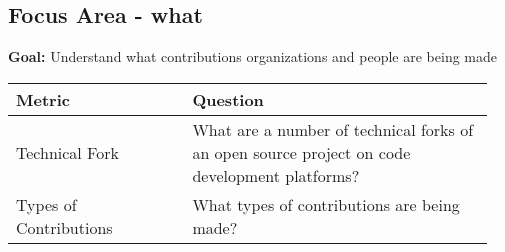 
\subsection{Focus Area - what}
\textbf{Goal:} Understand what contributions organizations and people are being made
\begin{table}[ht!]
    \centering
    \begin{tabular}{|p{0.35\linewidth} | p{0.6\linewidth}|}
        \hline
        \hfil \textbf{Metric}  & \hfil \textbf{Question} \\
        \hline
		Technical Fork & What are a number of technical forks of an open source project on code development platforms? \\ 
		\hline
		Types of Contributions & What types of contributions are being made? \\ 
		\hline
    \end{tabular}
\end{table}
